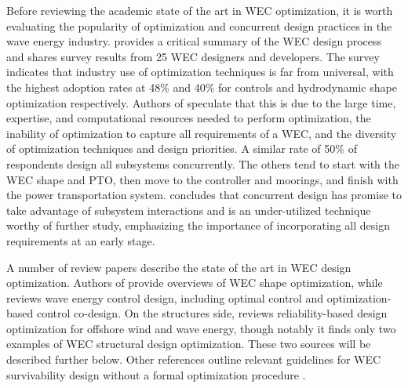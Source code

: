 Before reviewing the academic state of the art in WEC optimization, it is worth evaluating the popularity of optimization and concurrent design practices in the wave energy industry.
\cite{trueworthy_wave_2020} provides a critical summary of the WEC design process and shares survey results from 25 WEC designers and developers.
The survey indicates that industry use of optimization techniques is far from universal, with the highest adoption rates at 48\% and 40\% for controls and hydrodynamic shape optimization respectively.
Authors of \cite{trueworthy_wave_2020} speculate that this is due to the large time, expertise, and computational resources needed to perform optimization, the inability of optimization to capture all requirements of a WEC, and the diversity of optimization techniques and design priorities.
A similar rate of 50\% of respondents design all subsystems concurrently.
The others tend to start with the WEC shape and PTO, then move to the controller and moorings, and finish with the power transportation system.
\cite{trueworthy_wave_2020} concludes that concurrent design has promise to take advantage of subsystem interactions and is an under-utilized technique worthy of further study, emphasizing the importance of incorporating all design requirements at an early stage.

A number of review papers describe the state of the art in WEC design optimization.
Authors of \cite{garcia-teruel_review_2021,guo_geometric_2021} provide overviews of WEC shape optimization, while \cite{ringwood_empowering_2023} reviews wave energy control design, including optimal control and optimization-based control co-design.
On the structures side, \cite{clark_reliability-based_2018} reviews reliability-based design optimization for offshore wind and wave energy, though notably it finds only two examples of WEC structural design optimization.
These two sources \cite{ambuhl_reliability-based_2014, ferri_balancing_2014} will be described further below.
Other references outline relevant guidelines for WEC survivability design without a formal optimization procedure \cite{coe_survey_2018, ove_arup__partners_ltd_structural_2016,paduano_towards_2024,giannini_wave_2022}.

